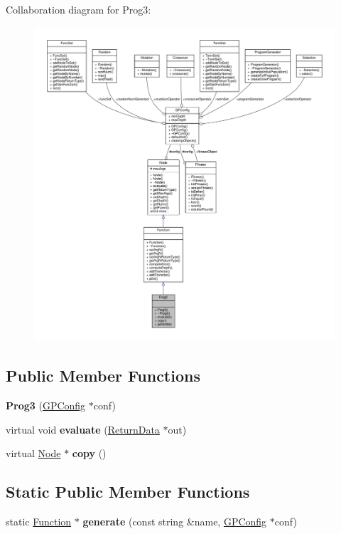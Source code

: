 Collaboration diagram for Prog3\+:
\nopagebreak
\begin{figure}[H]
\begin{center}
\leavevmode
\includegraphics[width=350pt]{classProg3__coll__graph}
\end{center}
\end{figure}
\subsection*{Public Member Functions}
\begin{DoxyCompactItemize}
\item 
\hypertarget{classProg3_a97abd230e67701241ff9b55211813175}{}\label{classProg3_a97abd230e67701241ff9b55211813175} 
{\bfseries Prog3} (\hyperlink{classGPConfig}{G\+P\+Config} $\ast$conf)
\item 
\hypertarget{classProg3_a03860caf456da8eca8a9e2e324d7df05}{}\label{classProg3_a03860caf456da8eca8a9e2e324d7df05} 
virtual void {\bfseries evaluate} (\hyperlink{classReturnData}{Return\+Data} $\ast$out)
\item 
\hypertarget{classProg3_a398d905914e1a6d7bb81ad97f97e9fa1}{}\label{classProg3_a398d905914e1a6d7bb81ad97f97e9fa1} 
virtual \hyperlink{classNode}{Node} $\ast$ {\bfseries copy} ()
\end{DoxyCompactItemize}
\subsection*{Static Public Member Functions}
\begin{DoxyCompactItemize}
\item 
\hypertarget{classProg3_a3632b942186a76c3eac8b2c97b964d62}{}\label{classProg3_a3632b942186a76c3eac8b2c97b964d62} 
static \hyperlink{classFunction}{Function} $\ast$ {\bfseries generate} (const string \&name, \hyperlink{classGPConfig}{G\+P\+Config} $\ast$conf)
\end{DoxyCompactItemize}
